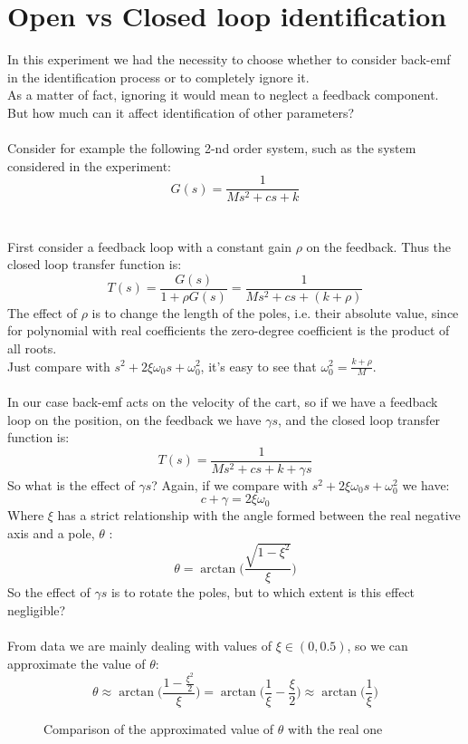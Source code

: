 \section{Open vs Closed loop identification}
\label{olvscl}
In this experiment we had the necessity to choose whether to consider back-emf in the identification process or to completely ignore it. \\
As a matter of fact, ignoring it would mean to neglect a feedback component. But how much can it affect identification of other parameters?
\\ \\
Consider for example the following 2-nd order system, such as the system considered in the experiment:
$$G(s) = \frac{1}{Ms^2+cs+k}$$
\\ \\
First consider a feedback loop with a constant gain $\rho$ on the feedback. Thus the closed loop transfer function is:
$$T(s) = \frac{G(s)}{1+\rho G(s)} = \frac{1}{Ms^2+cs+(k+\rho )}$$
The effect of $\rho$ is to change the length of the poles, i.e. their absolute value, since for polynomial with real coefficients the zero-degree coefficient is the product of all roots. \\
Just compare with $s^2+2\xi \omega_0 s+ \omega_0^2$, it's easy to see that $\omega_0^2 = \frac{k+\rho}{M}$.
\\\ \\
In our case  back-emf acts on the velocity of the cart, so if we have a feedback loop on the position, on the feedback we have  $\gamma s$, and the  closed loop transfer function is:
$$T(s) = \frac{1}{Ms^2+cs+k+\gamma s}$$
So what is the effect of $\gamma s$?
Again, if we compare with $s^2+2\xi \omega_0 s+ \omega_0^2$ we have:
$$c+\gamma = 2\xi \omega_0$$
Where $\xi$ has a strict relationship with the angle formed between the real negative axis and a pole,  $\theta$ :
$$\theta = \arctan \Big(\frac{\sqrt{1-\xi^2}}{\xi} \Big)$$
So the effect of $\gamma s$ is to rotate the poles, but to which extent is this effect negligible? \\ \\
From data we are mainly dealing with values of $\xi \in (0, 0.5)$, so we can approximate the value of $\theta$:
$$\theta \approx \arctan \Big(\frac{1-\frac{\xi^2}{2}}{\xi} \Big) = \arctan \Big(\frac{1}{\xi}-\frac{\xi}{2} \Big) \approx \arctan \Big (\frac{1}{\xi} \Big)$$
\begin{figure}[ht]
\centering
{}
\caption{Comparison of the approximated value of $\theta$ with the real one} \label{fig:theta_comparison}
\end{figure}
